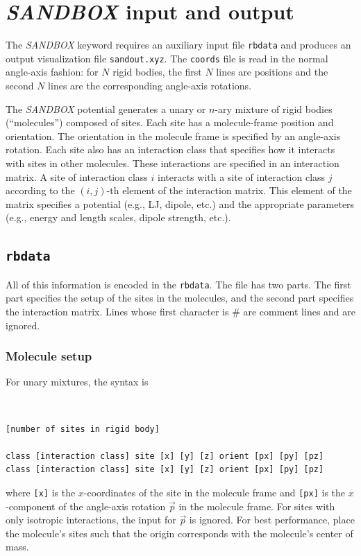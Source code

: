 \documentclass[12pt,a4paper,dvips]{article}
\begin{document}

\section{{\it SANDBOX} input and output}

The {\it SANDBOX} keyword requires an auxiliary input file {\tt rbdata} and produces an output visualization file {\tt sandout.xyz}. The {\tt coords} file is read in the normal angle-axis fashion: for $N$ rigid bodies, the first $N$ lines are positions and the second $N$ lines are the corresponding angle-axis rotations.

The {\it SANDBOX} potential generates a unary or $n$-ary mixture of rigid bodies (``molecules'') composed of sites. Each site has a molecule-frame position and orientation. The orientation in the molecule frame is specified by an angle-axis rotation. Each site also has an interaction class that specifies how it interacts with sites in other molecules. These interactions are specified in an interaction matrix. A site of interaction class $i$ interacts with a site of interaction class $j$ according to the $(i,j)$-th element of the interaction matrix. This element of the matrix specifies a potential (e.g., LJ, dipole, etc.) and the appropriate parameters (e.g., energy and length scales, dipole strength, etc.).

\subsection{{\tt rbdata}}
All of this information is encoded in the {\tt rbdata}. The file has two parts. The first part specifies the setup of the sites in the molecules, and the second part specifies the interaction matrix. Lines whose first character is \# are comment lines and are ignored.

\subsubsection{Molecule setup}
For unary mixtures, the syntax is
{\tt
\begin{verbatim}
[number of sites in rigid body]

class [interaction class] site [x] [y] [z] orient [px] [py] [pz]
class [interaction class] site [x] [y] [z] orient [px] [py] [pz]
\end{verbatim}
}
where {\tt [x]} is the $x$-coordinates of the site in the molecule frame and {\tt [px]} is the $x$-component of the angle-axis rotation $\vec{p}$ in the molecule frame. For sites with only isotropic interactions, the input for $\vec{p}$ is ignored. For best performance, place the molecule's sites such that the origin corresponds with the molecule's center of mass.
\end{document}
